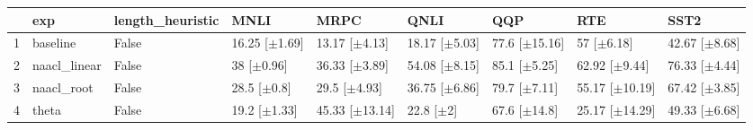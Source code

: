 \begin{table}[ht]
\centering
\begin{tabular}{rllllllll}
  \hline
 & exp & length_heuristic & MNLI & MRPC & QNLI & QQP & RTE & SST2 \\ 
  \hline
1 & baseline & False & 16.25 [$\pm$1.69] & 13.17 [$\pm$4.13] & 18.17 [$\pm$5.03] & 77.6 [$\pm$15.16] & 57 [$\pm$6.18] & 42.67 [$\pm$8.68] \\ 
  2 & naacl_linear & False & 38 [$\pm$0.96] & 36.33 [$\pm$3.89] & 54.08 [$\pm$8.15] & 85.1 [$\pm$5.25] & 62.92 [$\pm$9.44] & 76.33 [$\pm$4.44] \\ 
  3 & naacl_root & False & 28.5 [$\pm$0.8] & 29.5 [$\pm$4.93] & 36.75 [$\pm$6.86] & 79.7 [$\pm$7.11] & 55.17 [$\pm$10.19] & 67.42 [$\pm$3.85] \\ 
  4 & theta & False & 19.2 [$\pm$1.33] & 45.33 [$\pm$13.14] & 22.8 [$\pm$2] & 67.6 [$\pm$14.8] & 25.17 [$\pm$14.29] & 49.33 [$\pm$6.68] \\ 
   \hline
\end{tabular}
\end{table}
